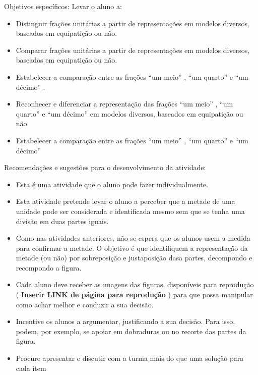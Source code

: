 \documentclass[a4paper,12pt,twoside]{book}
\begin{document}
\begin{professor*}[breakable]{}{}  
  
  Objetivos específicos: Levar o aluno a:  
\begin{itemize} %
    \item       Distinguir frações unitárias a partir de representações em modelos diversos, baseados em equipatição ou não. 
    \item       Comparar frações unitárias a partir de representações em modelos diversos, baseados em equipatição ou não.
    \item       Estabelecer a comparação entre as frações       ``um meio''      ,       ``um quarto''       e       ``um décimo''      . 
    \item       Reconhecer e diferenciar a representação das frações       ``um meio''      ,       ``um quarto''       e       ``um décimo''       em modelos diversos, baseados em equipatição ou não.
    \item       Estabelecer a comparação entre as frações       ``um meio''      ,       ``um quarto''       e       ``um décimo''       
\end{itemize} %
  
  
  Recomendações e sugestões para o desenvolvimento da atividade:  
\begin{itemize} %
    \item       Esta é uma atividade que o aluno pode fazer individualmente.
    \item       Esta atividade pretende levar o aluno a perceber que a metade de uma unidade pode ser considerada e identificada mesmo sem que se tenha uma divisão em duas partes iguais. 
    \item       Como nas atividades anteriores, não se espera que os alunos usem a medida para confirmar a metade. O objetivo é que identifiquem a representação da metade (ou não) por sobreposição e justaposição dasa partes, decompondo e recompondo a figura.
    \item       Cada aluno deve receber as imagens das figuras, disponíveis para reprodução (      {\bf Inserir LINK de página para reprodução}      ) para que possa manipular como achar melhor e conduzir a sua decisão. 
    \item       Incentive os alunos a argumentar, justificando a sua decisão. Para isso, podem, por exemplo, se apoiar em dobraduras ou no recorte das partes da figura.
    \item       Procure apresentar e discutir com a turma mais do que uma solução para cada item   
\end{itemize} %
  
\end{professor*}
\end{document}
